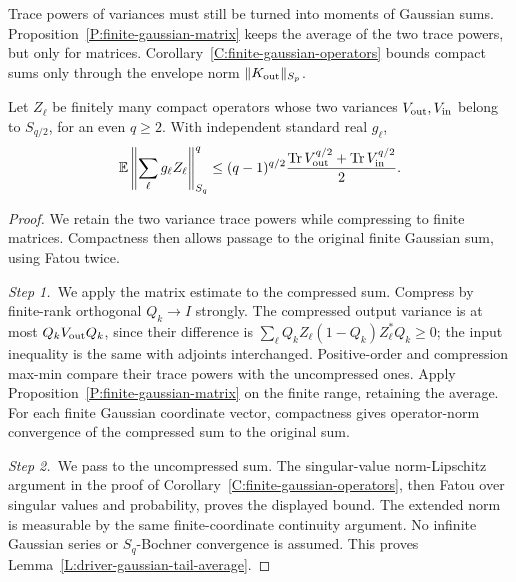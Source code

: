 Trace powers of variances must still be turned into moments of Gaussian sums.
Proposition~\ref{P:finite-gaussian-matrix} keeps the average of the two trace
powers, but only for matrices. Corollary~\ref{C:finite-gaussian-operators}
bounds compact sums only through the envelope norm $\|K_{\rm out}\|_{S_p}$.

\begin{lemma}\label{L:driver-gaussian-tail-average}
  Let $Z_\ell$ be finitely many compact operators whose two variances $V_{\rm
  out},V_{\rm in}$ belong to $S_{q/2}$, for an even $q \ge 2$. With independent
  standard real $g_\ell$,
  \begin{equation}\label{E:driver-retained-gaussian-average}
    \mathbb{E}\left\|\sum_\ell g_\ell Z_\ell\right\|_{S_q}^q
    \le(q-1)^{q/2}\frac{\operatorname{Tr}V_{\rm out}^{q/2}
    +\operatorname{Tr}V_{\rm in}^{q/2}}2.
  \end{equation}
\end{lemma}

\begin{proof}
  We retain the two variance trace powers while compressing to finite
  matrices. Compactness then allows passage to the original finite Gaussian
  sum, using Fatou twice.

  \medskip
  \noindent\textit{Step 1.~}We apply the matrix estimate to the compressed
  sum.
  Compress by finite-rank orthogonal $Q_k \to I$ strongly. The compressed output
  variance is at most $Q_kV_{\rm out}Q_k$, since their difference is $\sum_\ell
  Q_kZ_\ell(1-Q_k)Z_\ell^*Q_k \ge 0$; the input inequality is the same with
  adjoints interchanged. Positive-order and compression max-min compare their
  trace powers with the uncompressed ones.
  Apply
  Proposition~\ref{P:finite-gaussian-matrix} on the finite range, retaining the
  average. For each finite Gaussian coordinate vector, compactness gives
  operator-norm convergence of the compressed sum to the original sum.

  \medskip
  \noindent\textit{Step 2.~}We pass to the uncompressed sum.
  The singular-value norm-Lipschitz argument in the proof of
  Corollary~\ref{C:finite-gaussian-operators}, then Fatou over singular values
  and probability, proves the displayed bound. The extended norm is measurable
  by the same finite-coordinate continuity argument. No infinite Gaussian series
  or $S_q$-Bochner convergence is assumed. This proves
  Lemma~\ref{L:driver-gaussian-tail-average}.
\end{proof}

